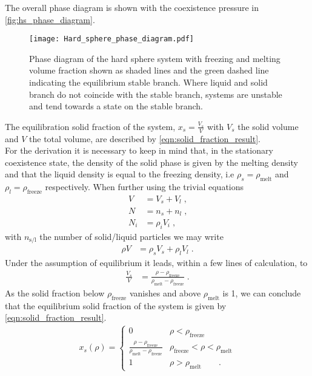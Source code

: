 The overall phase diagram is shown with the coexistence pressure in \autoref{fig:hs_phase_diagram}.\\

\begin{figure}[h]
\centering
\texttt{[image: Hard\_sphere\_phase\_diagram.pdf]}
\caption[Phase diagram of hard sphere fluid]{Phase diagram of the hard sphere system with freezing and melting volume fraction shown as shaded lines and the green dashed line indicating the equilibrium stable branch. Where liquid and solid branch do not coincide with the stable branch, systems are unstable and tend towards a state on the stable branch.}
\label{fig:hs_phase_diagram}
\end{figure}
\FloatBarrier
The equilibration solid fraction of the system, $x_s = \frac{V_s}{V}$ with $V_s$ the solid volume and $V$ the total volume, are described by \autoref{eqn:solid_fraction_result}.\\ 
For the derivation it is necessary to keep in mind that, in the stationary coexistence state, the density of the solid phase is given by the melting density and that the liquid density is equal to the freezing density, i.e $\rho_s = \rho_{\text{melt}}$ and $\rho_l = \rho_{\text{freeze}}$ respectively. When further using the trivial equations
\begin{align}
V &= V_s + V_l \; \text{,} \nonumber\\
N &= n_s + n_l \; \text{,} \nonumber\\
N_i &= \rho_i V_i \; \text{,} 
\end{align}
with $n_{\text{s/l}}$ the number of solid/liquid particles we may write
\begin{align}
\rho V &= \rho_s V_s + \rho_l V_l \; \text{.}
\end{align}
Under the assumption of equilibrium it leads, within a few lines of calculation, to 
\begin{align}
\frac{V_s}{V} &= \frac{\rho - \rho_{\text{freeze}}}{\rho_{\text{melt}} - \rho_{\text{freeze}} } \; \text{.}
\end{align}
As the solid fraction below $\rho_{\text{freeze}} $ vanishes and above $\rho_{\text{melt}}$ is 1, we can conclude that the equilibrium solid fraction of the system is given by \autoref{eqn:solid_fraction_result}.
\begin{align}
\label{eqn:solid_fraction_result}
x_s(\rho) = 
\begin{cases}
0 & \rho <  \rho_{\text{freeze}}\\
\frac{\rho-\rho_{\text{freeze}}}{\rho_{\text{melt}}-\rho_{\text{freeze}}} &  \rho_{\text{freeze}} < \rho <  \rho_{\text{melt}}\\ 
1 &  \rho > \rho_{\text{melt}} \quad \quad \text{.}
\end{cases}
\end{align}

